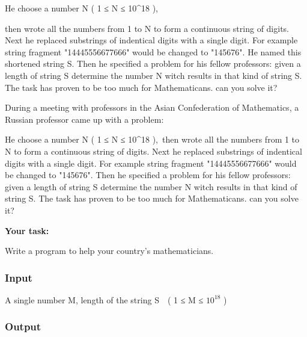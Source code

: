 












    He choose a number N ( 1 ≤ N ≤ 10^18 ),   

    then wrote all the numbers from 1 to N to form a continuous string of digits. Next he replaced substrings of indentical digits with a single digit. For example string fragment "14445556677666" would be changed to "145676". He named this shortened string S. Then he specified a problem for his fellow professors: given a length of string S determine the number N witch results in that kind of string S. The task has proven to be too much for Mathematicans. can you solve it?   



    During a meeting with professors in the Asian Confederation of Mathematics, a Russian professor came up with a problem:   



    He choose a number N ( 1 ≤ N ≤ 10^18 ), then wrote all the numbers from 1 to N to form a continuous string of digits. Next he replaced substrings of indentical digits with a single digit. For example string fragment "14445556677666" would be changed to "145676". Then he specified a problem for his fellow professors: given a length of string S determine the number N witch results in that kind of string S. The task has proven to be too much for Mathematicans. can you solve it?   



\textbf{     Your task:    }



    Write a program to help your country's mathematicians.   



\subsubsection{    Input   }



     A single number M, length of the string S  ( 1 ≤ M ≤ $10^{18}$     )    



\subsubsection{    Output   }



